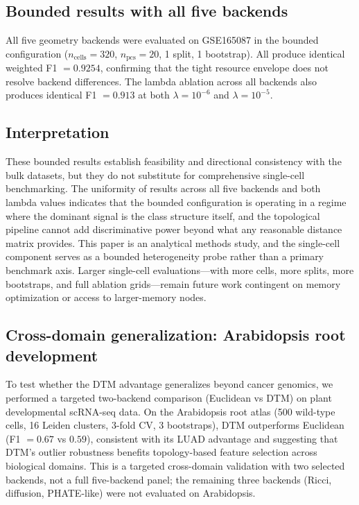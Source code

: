 \documentclass[11pt]{article}
\begin{document}
\subsection{Bounded results with all five backends}

All five geometry backends were evaluated on GSE165087 in the bounded configuration ($n_{\text{cells}} = 320$, $n_{\text{pcs}} = 20$, 1 split, 1 bootstrap).
All produce identical weighted F1 $= 0.9254$, confirming that the tight resource envelope does not resolve backend differences.
The lambda ablation across all backends also produces identical F1 $= 0.913$ at both $\lambda = 10^{-6}$ and $\lambda = 10^{-5}$.

\subsection{Interpretation}

These bounded results establish feasibility and directional consistency with the bulk datasets, but they do not substitute for comprehensive single-cell benchmarking.
The uniformity of results across all five backends and both lambda values indicates that the bounded configuration is operating in a regime where the dominant signal is the class structure itself, and the topological pipeline cannot add discriminative power beyond what any reasonable distance matrix provides.
This paper is an analytical methods study, and the single-cell component serves as a bounded heterogeneity probe rather than a primary benchmark axis.
Larger single-cell evaluations---with more cells, more splits, more bootstraps, and full ablation grids---remain future work contingent on memory optimization or access to larger-memory nodes.

\subsection{Cross-domain generalization: Arabidopsis root development}

To test whether the DTM advantage generalizes beyond cancer genomics, we performed a targeted two-backend comparison (Euclidean vs DTM) on plant developmental scRNA-seq data.
On the Arabidopsis root atlas (500 wild-type cells, 16 Leiden clusters, 3-fold CV, 3 bootstraps), DTM outperforms Euclidean (F1 $= 0.67$ vs $0.59$), consistent with its LUAD advantage and suggesting that DTM's outlier robustness benefits topology-based feature selection across biological domains.
This is a targeted cross-domain validation with two selected backends, not a full five-backend panel; the remaining three backends (Ricci, diffusion, PHATE-like) were not evaluated on Arabidopsis.
\end{document}
